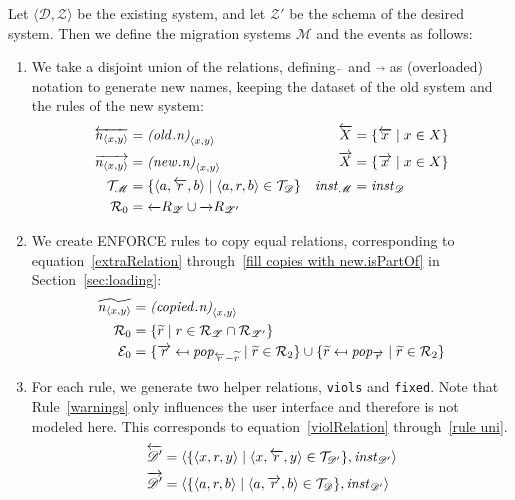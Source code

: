 \documentclass[runningheads]{llncs}
\newcommand{\id}[1]{\text{\it #1\/}}
\newcommand{\popF}[1]{\id{pop}_{#1}}
\newcommand{\instance}{\mathbin{\id{inst}}}
\newcommand{\declare}[3]{\id{#1}_{\pair{#2}{#3}}}
\newcommand{\pair}[2]{\langle{#1},{#2}\rangle}
\newcommand{\triple}[3]{\langle{#1},{#2},{#3}\rangle}
\newcommand{\rels}{\mathcal{R}}   %
\newcommand{\triples}{\mathcal{T}}
\newcommand{\enforces}{\mathcal{E}}
\newcommand{\rules}{\mathcal{U}}
\newcommand{\dataset}{\mathscr{D}}
\newcommand{\schema}{\mathscr{Z}}
\newcommand{\migrsys}{\mathscr{M}}
\begin{document}
   Let $\pair{\dataset}{\schema}$ be the existing system, and let ${\schema'}$ be the schema of the desired system.
   Then we define the migration systems $\migrsys$ and the events as follows:
\begin{enumerate}
\item We take a disjoint union of the relations, defining $\overleftarrow~$ and $\overrightarrow~$ as (overloaded) notation to generate new names, keeping the dataset of the old system and the rules of the new system:
   \begin{align}
   \overleftarrow{\declare{n}{x}{y}}&=\declare{(\id{old}.n)}{x}{y}&\overleftarrow{X} &= \{\overleftarrow{x}\mid x\in X\}\\
   \overrightarrow{\declare{n}{x}{y}}&=\declare{(\id{new}.n)}{x}{y}& \overrightarrow{X} &= \{\overrightarrow{x}\mid x\in X\}\\
   \triples_\migrsys &= \{\triple{a}{\overleftarrow{r}}{b} \mid \triple{a}{r}{b}\in\triples_\dataset\}&
   \instance_\migrsys &= \instance_\dataset\\
   \rels_\theenumi &= \overleftarrow\rels_{\schema} \cup \overrightarrow\rels_{\schema'}
   \end{align}
\item We create ENFORCE rules to copy equal relations, corresponding to equation~\ref{extraRelation} through~\ref{fill copies with new.isPartOf} in Section~\ref{sec:loading}:
   \begin{align}
   \widetilde{\declare{n}{x}{y}} &= \declare{(\id{copied}.n)}{x}{y}\\
   \rels_\theenumi &= \{\widetilde{r}\mid r \in \rels_\schema \cap \rels_{\schema'}\}\\
   \enforces_\theenumi &= \{\overrightarrow{r}\mapsfrom \popF{\overleftarrow{r} - \widetilde{r}} \mid \widetilde{r} \in \rels_2\} \cup \{\widetilde{r}\mapsfrom \popF{\overrightarrow{r}} \mid \widetilde{r} \in \rels_2\}
   \end{align}
\item For each rule, we generate two helper relations, {\tt viols} and {\tt fixed}. Note that Rule~\ref{warnings} only influences the user interface and therefore is not modeled here. This corresponds to equation~\ref{violRelation} through~\ref{rule uni}.
   \begin{align}
   \overleftarrow{\dataset'} &= \pair{\{\triple{x}{{r}}{y}\mid \triple{x}{\overleftarrow{r}}{y} \in \triples_{\dataset'}\}}{\instance_{\dataset'}}\\
   \overrightarrow{\dataset'} &= \pair{\{\triple{a}{{r}}{b} \mid \triple{a}{\overrightarrow{r}}{b}\in\triples_\dataset\}}{\instance_{\dataset'}} \\

\end{align}
\end{enumerate}
\end{document}
